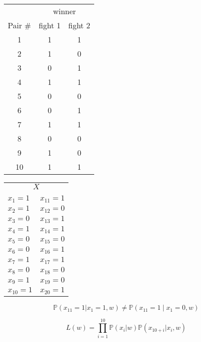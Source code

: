 \documentclass[landscape]{foils}
\renewcommand{\Pr}{\mathbb{P}}
\begin{document}
\myNewSlide
\begin{center}
\begin{tabular}{|c|c|c|}
\hline
& \multicolumn{2}{c|}{winner}\\
Pair \# & fight 1 & fight 2 \\
\hline
1 & 1 & 1  \\
\hline
2 & 1 & 0  \\
\hline
3 & 0 & 1  \\
\hline
4 & 1 & 1  \\
\hline
5 & 0 & 0  \\
\hline
6 & 0 & 1   \\
\hline
7 & 1 & 1  \\
\hline
8 & 0 & 0  \\
\hline
9 & 1 & 0  \\
\hline
10 & 1 & 1   \\
\hline
\end{tabular}
\begin{tabular}{ll}
\multicolumn{2}{c}{$X$}\\
\\
$x_1 = 1$ & $x_{11} = 1$  \\
$x_2 = 1$ & $x_{12} = 0$  \\
$x_3 = 0$ & $x_{13} = 1$  \\
$x_4 = 1$ & $x_{14} = 1$  \\
$x_5 = 0$ & $x_{15} = 0$  \\
$x_6 = 0$ & $x_{16} = 1$  \\
$x_7 = 1$ & $x_{17} = 1$  \\
$x_8 = 0$ & $x_{18} = 0$  \\
$x_9 = 1$ & $x_{19} = 0$  \\
$x_{10} = 1$ & $x_{20} = 1$  \\
\end{tabular}
\end{center}

$$\Pr(x_{11} = 1 | x_{1} = 1, w) \neq \Pr(x_{11} = 1 \mid x_{1} = 0, w)$$

$$L(w) = \prod_{i=1}^{10} \Pr(x_i|w)\Pr(x_{10+i}|x_{i}, w)$$
\end{document}
